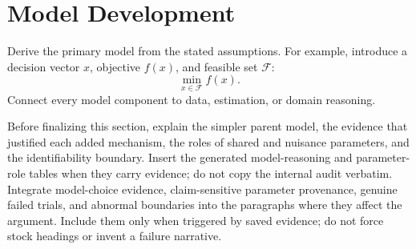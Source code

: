 \section{Model Development}

Derive the primary model from the stated assumptions. For example, introduce a
decision vector \(x\), objective \(f(x)\), and feasible set \(\mathcal{F}\):
\[
  \min_{x\in\mathcal{F}} f(x).
\]
Connect every model component to data, estimation, or domain reasoning.

Before finalizing this section, explain the simpler parent model, the evidence
that justified each added mechanism, the roles of shared and nuisance
parameters, and the identifiability boundary. Insert the generated
model-reasoning and parameter-role tables when they carry evidence; do not copy
the internal audit verbatim.
Integrate model-choice evidence, claim-sensitive parameter provenance, genuine
failed trials, and abnormal boundaries into the paragraphs where they affect the
argument. Include them only when triggered by saved evidence; do not force stock
headings or invent a failure narrative.
